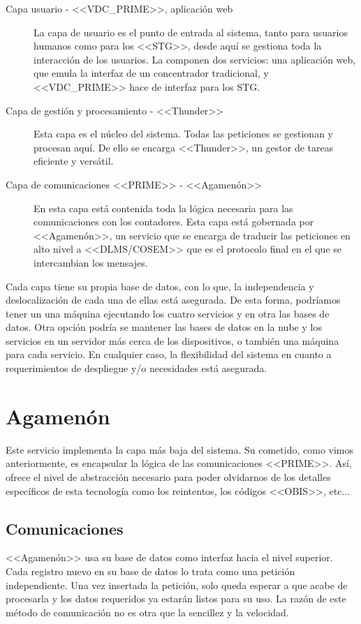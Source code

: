 \begin{description}
	\item[Capa usuario - <<VDC\_PRIME>>, aplicación web] La capa de usuario es el punto de entrada al sistema, tanto para usuarios humanos como para los <<STG>>, desde aquí se gestiona toda la interacción de los usuarios. La componen dos servicios: una aplicación web, que emula la interfaz de un concentrador tradicional, y <<VDC\_PRIME>> hace de interfaz para los STG. 
	\item[Capa de gestión y procesamiento - <<Thunder>>] Esta capa es el núcleo del sistema. Todas las peticiones se gestionan y procesan aquí. De ello se encarga <<Thunder>>, un gestor de tareas eficiente y versátil.
	\item[Capa de comunicaciones <<PRIME>> - <<Agamenón>>] En esta capa está contenida toda la lógica necesaria para las comunicaciones con los contadores. Esta capa está gobernada por <<Agamenón>>, un servicio que se encarga de traducir las peticiones en alto nivel a <<DLMS/COSEM>> que es el protocolo final en el que se intercambian los mensajes.
\end{description}

Cada capa tiene su propia base de datos, con lo que, la independencia y deslocalización de cada una de ellas está asegurada. De esta forma, podríamos tener un una máquina ejecutando los cuatro servicios y en otra las bases de datos. Otra opción podría se mantener las bases de datos en la nube y los servicios en un servidor más cerca de los dispositivos, o también una máquina para cada servicio. En cualquier caso, la flexibilidad del sistema en cuanto a requerimientos de despliegue y/o necesidades está asegurada.


\section{Agamenón}
Este servicio implementa la capa más baja del sistema. Su cometido, como vimos anteriormente, es encapsular la lógica de las comunicaciones <<PRIME>>. Así, ofrece el nivel de abstracción necesario para poder olvidarnos de los detalles específicos de esta tecnología como los reintentos, los códigos <<OBIS>>, etc...
\subsection{Comunicaciones}
<<Agamenón>> usa su base de datos como interfaz hacia el nivel superior. Cada registro nuevo en su base de datos lo trata como una petición independiente. Una vez insertada la petición, solo queda esperar a que acabe de procesarla y los datos requeridos ya estarán listos para su uso. La razón de este método de comunicación no es otra que la sencillez y la velocidad. 

